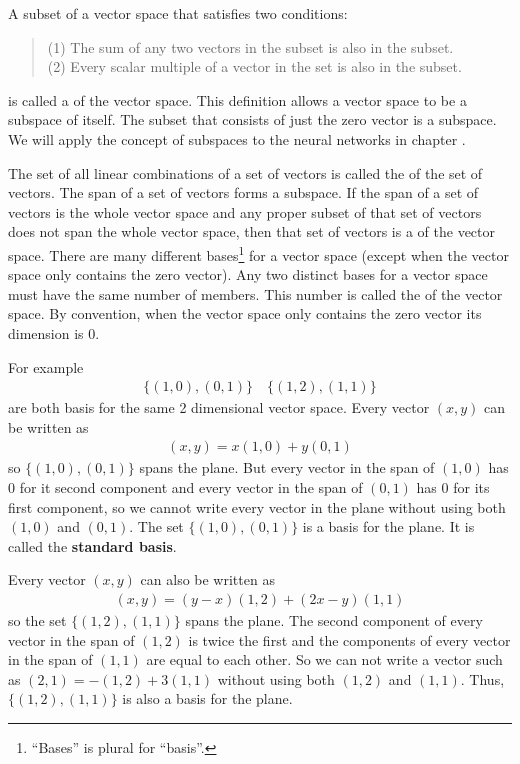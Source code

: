    A subset of a vector space that satisfies two conditions:
\begin{quote}
(1) The sum of any two vectors in the subset is also in the subset.   \\
(2) Every scalar multiple of a vector in the set is also in the subset. 
\end{quote}
is called a  of the vector space. This definition allows a 
vector space to be a subspace of itself. The subset that consists of just the
zero vector is a subspace. We will apply the concept of subspaces to the 
neural networks in chapter . 

   The set of all linear combinations of a set of vectors is called the 
 of the set of vectors. The span of a set of vectors forms a 
subspace. If the span of a set of vectors is the whole vector space and any
proper subset of that set of vectors does not span the whole vector space, then 
that set of vectors is a  of the vector space. There are
many different bases\footnote{``Bases'' is plural for ``basis''.} for a vector 
space (except when the vector space only contains the zero vector). Any
two distinct bases for a vector space must have the same number of members. 
This number is called the  of the vector space. By
convention, when the vector space only contains the zero vector its dimension 
is $0$.

   For example
\begin{eqnarray*}
\{ (1,0), (0,1) \} \quad \{ (1,2), (1,1) \}
\end{eqnarray*}
are both basis for the same 2 dimensional vector space. Every vector $(x,y)$
can be written as
\begin{eqnarray*}
(x,y) = x(1,0)+y(0,1)
\end{eqnarray*}  
so $\{ (1,0), (0,1) \}$ spans the plane. But every vector in the span of
$(1,0)$ has $0$ for it second component and every vector in the span of $(0,1)$
has $0$ for its first component, so we cannot write every vector in the plane 
without using both $(1,0)$ and $(0,1)$. The set $\{ (1,0), (0,1) \}$ is a basis for the plane. It is called the {\bf standard basis}. 

   Every vector $(x,y)$ can also be written as
\begin{eqnarray*}
 (x,y) =(y-x)(1,2) +(2x-y)(1,1)
\end{eqnarray*}  
so the set $\{ (1,2), (1,1) \}$ spans the plane. The second component of every
vector in the span of $(1,2)$ is twice the first and the components of every 
vector in the span of $(1,1)$ are equal to each other. So we can not write a
vector such as $(2,1) = -(1,2)+3 (1,1)$ without using both $(1,2)$ and $(1,1)$.
Thus, $\{ (1,2), (1,1) \}$ is also a basis for the plane. 

